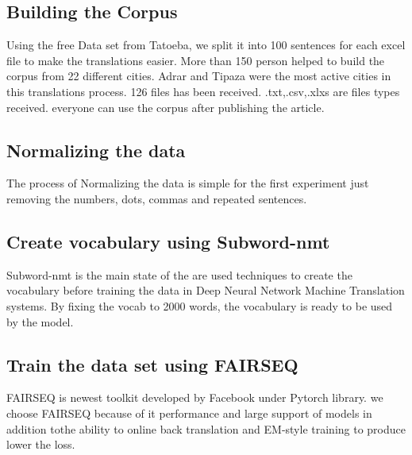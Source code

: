 \documentclass[paper=a4, fontsize=11pt]{scrartcl}
\numberwithin{equation}{section}		%
\numberwithin{figure}{section}			%
\numberwithin{table}{section}				%
\begin{document}
\subsection{Building the Corpus}
Using the free Data set from Tatoeba, we split it into 100 sentences for each excel file to make the translations easier. More than 150 person helped to build the corpus from 22 different cities. Adrar and Tipaza were the most active cities in this translations process. 126 files has been received. .txt,.csv,.xlxs are files types received. everyone can use the corpus after publishing the article.
\subsection{Normalizing the data}
The process of Normalizing the data is simple for the first experiment just removing the numbers, dots, commas and repeated sentences.
\subsection{Create vocabulary using Subword-nmt}
Subword-nmt is the main state of the are used techniques to create the vocabulary before training the data in Deep Neural Network Machine Translation systems. By fixing the vocab to 2000 words, the vocabulary is ready to be used by the model.
\subsection{Train the data set using FAIRSEQ\cite{ott2019fairseq}}
FAIRSEQ\cite{ott2019fairseq} is newest toolkit developed by Facebook under Pytorch library. we choose FAIRSEQ\cite{ott2019fairseq} because of it performance and large support of models in addition tothe ability to online back translation and EM-style\cite{shen2017style} training to produce lower the loss.
\pagebreak
\end{document}
